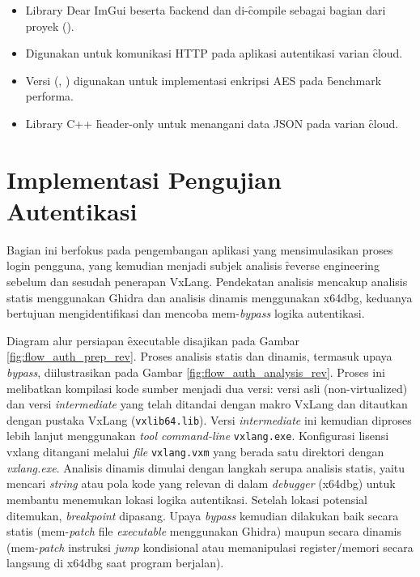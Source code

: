\begin{itemize}
\begin{itemize}
		      \item {} Library Dear ImGui beserta \f{backend}  dan  di-\f{compile} sebagai bagian dari proyek ().
		      \item {} Digunakan untuk komunikasi HTTP pada aplikasi autentikasi varian \f{cloud}.
		      \item {} Versi  (, ) digunakan untuk implementasi enkripsi AES pada \f{benchmark} performa.
		      \item {} Library C++ \f{header-only} untuk menangani data JSON pada varian \f{cloud}.
	      \end{itemize}
\end{itemize}

\section{Implementasi Pengujian Autentikasi}
Bagian ini berfokus pada pengembangan aplikasi yang mensimulasikan proses login pengguna, yang kemudian menjadi subjek analisis \f{reverse engineering} sebelum dan sesudah penerapan VxLang. Pendekatan analisis mencakup analisis statis menggunakan Ghidra dan analisis dinamis menggunakan x64dbg, keduanya bertujuan mengidentifikasi dan mencoba mem-\textit{bypass} logika autentikasi.

Diagram alur persiapan \f{executable} disajikan pada Gambar \ref{fig:flow_auth_prep_rev}. Proses analisis statis dan dinamis, termasuk upaya \textit{bypass}, diilustrasikan pada Gambar \ref{fig:flow_auth_analysis_rev}. Proses ini melibatkan kompilasi kode sumber menjadi dua versi: versi asli (non-virtualized) dan versi \textit{intermediate} yang telah ditandai dengan makro VxLang dan ditautkan dengan pustaka VxLang (\texttt{vxlib64.lib}). Versi \textit{intermediate} ini kemudian diproses lebih lanjut menggunakan \textit{tool command-line} \texttt{vxlang.exe}. Konfigurasi lisensi vxlang ditangani melalui \textit{file} \texttt{vxlang.vxm} yang berada satu direktori dengan \textit{vxlang.exe}. Analisis dinamis dimulai dengan langkah serupa analisis statis, yaitu mencari \textit{string} atau pola kode yang relevan di dalam \textit{debugger} (x64dbg) untuk membantu menemukan lokasi logika autentikasi. Setelah lokasi potensial ditemukan, \textit{breakpoint} dipasang. Upaya \textit{bypass} kemudian dilakukan baik secara statis (mem-\textit{patch} file \textit{executable} menggunakan Ghidra) maupun secara dinamis (mem-\textit{patch} instruksi \textit{jump} kondisional atau memanipulasi register/memori secara langsung di x64dbg saat program berjalan).

